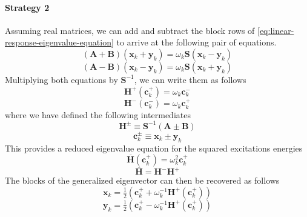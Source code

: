 \paragraph{Strategy 2}
Assuming real matrices, we can add and subtract the block rows of
\cref{eq:linear-response-eigenvalue-equation} to arrive at the following pair of
equations.
\begin{equation}
    \label{eq:a-plus-b}
    (\mathbf{A} + \mathbf{B})
    (\mathbf{x}_k + \mathbf{y}_k)
    =
    \omega_k
    \mathbf{S}
    (\mathbf{x}_k - \mathbf{y}_k)
\end{equation}
\begin{equation}
    \label{eq:a-minus-b}
    (\mathbf{A} - \mathbf{B})
    (\mathbf{x}_k - \mathbf{y}_k)
    =
    \omega_k
    \mathbf{S}
    (\mathbf{x}_k + \mathbf{y}_k)
\end{equation}
Multiplying both equations by \(\mathbf{S}^{-1}\), we can write them as follows
\begin{equation}
    \mathbf{H}^+(\mathbf{c}_k^+)
    =
    \omega_k
    \mathbf{c}_k^-
\end{equation}
\begin{equation}
    \mathbf{H}^-(\mathbf{c}_k^-)
    =
    \omega_k
    \mathbf{c}_k^+
\end{equation}
where we have defined the following intermediates
\begin{equation}
    \mathbf{H}^{\pm}
    \equiv
    \mathbf{S}^{-1}
    (\mathbf{A} \pm \mathbf{B})
\end{equation}
\begin{equation}
    \mathbf{c}_k^{\pm}
    \equiv
    \mathbf{x}_k \pm \mathbf{y}_k
\end{equation}
This provides a reduced eigenvalue equation for the squared excitations energies
\begin{equation}
    \overline{\mathbf{H}}(\mathbf{c}_k^+)
    =
    \omega_k^2
    \mathbf{c}_k^+
\end{equation}
\begin{equation}
    \overline{\mathbf{H}}
    =
    \mathbf{H}^-
    \mathbf{H}^+
\end{equation}
The blocks of the generalized eigenvector can then be recovered as follows
\begin{equation}
    \mathbf{x}_k
    =
    \tfrac{1}{2}
    (
        \mathbf{c}_k^+
        +
        \omega_k^{-1}
        \mathbf{H}^+(\mathbf{c}_k^+)
    )
\end{equation}
\begin{equation}
    \mathbf{y}_k
    =
    \tfrac{1}{2}
    (
        \mathbf{c}_k^+
        -
        \omega_k^{-1}
        \mathbf{H}^+(\mathbf{c}_k^+)
    )
\end{equation}

